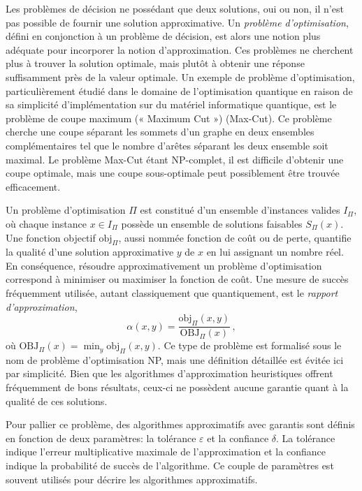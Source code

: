 Les problèmes de décision ne possédant que deux solutions, oui ou non, il n'est pas possible de fournir une solution approximative. Un \textit{problème d'optimisation}, défini en conjonction à un problème de décision, est alors une notion plus adéquate pour incorporer la notion d'approximation. Ces problèmes ne cherchent plus à trouver la solution optimale, mais plutôt à obtenir une réponse suffisamment près de la valeur optimale. Un exemple de problème d'optimisation, particulièrement étudié dans le domaine de l'optimisation quantique en raison de sa simplicité d'implémentation sur du matériel informatique quantique, est le problème de coupe maximum (­« Maximum Cut ») (Max-Cut). Ce problème cherche une coupe séparant les sommets d'un graphe en deux ensembles complémentaires tel que le nombre d'arêtes séparant les deux ensemble soit maximal. Le problème Max-Cut étant \textsf{NP}-complet, il est difficile d'obtenir une coupe optimale, mais une coupe sous-optimale peut possiblement être trouvée efficacement.

Un problème d'optimisation $\Pi$ est constitué d'un ensemble d'instances valides $I_{\Pi}$, où chaque instance $x \in I_{\Pi}$ possède un ensemble de solutions faisables $S_{\Pi}(x)$. Une fonction objectif $\text{obj}_{\Pi}$, aussi nommée fonction de coût ou de perte, quantifie la qualité d'une solution approximative $y$ de $x$ en lui assignant un nombre réel. En conséquence, résoudre approximativement un problème d'optimisation correspond à minimiser ou maximiser la fonction de coût. Une mesure de succès fréquemment utilisée, autant classiquement que quantiquement, est le \textit{rapport d'approximation},
\begin{equation}
    \alpha(x, y) = \frac{\text{obj}_{\Pi}(x, y)}{\text{OBJ}_{\Pi}(x)} \,,
\end{equation}
où $\text{OBJ}_{\Pi}(x) = \min_{y} \text{obj}_{\Pi} (x, y)$. Ce type de problème est formalisé sous le nom de problème d'optimisation \textsf{NP}, mais une définition détaillée est évitée ici par simplicité. Bien que les algorithmes d'approximation heuristiques offrent fréquemment de bons résultats, ceux-ci ne possèdent aucune garantie quant à la qualité de ces solutions.

Pour pallier ce problème, des algorithmes approximatifs avec garantis sont définis en fonction de deux paramètres: la tolérance $\varepsilon$ et la confiance $\delta$. La tolérance indique l'erreur multiplicative maximale de l'approximation et la confiance indique la probabilité de succès de l'algorithme. Ce couple de paramètres est souvent utilisés pour décrire les algorithmes approximatifs.

